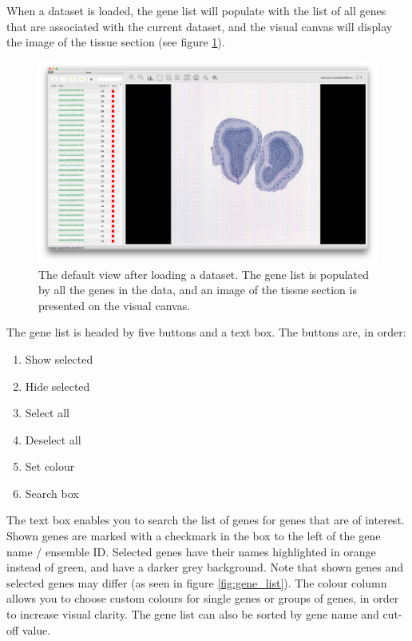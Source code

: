 \documentclass[10pt,a4paper,titlepage]{book}
\begin{document}
When a dataset is loaded, the gene list will populate with the list of all genes that are associated with the current dataset, and the visual canvas will display the image of the tissue section (see figure \ref{fig:default_loaded_data}). 
\begin{figure}[h]
	\centering
	\includegraphics[width=0.8\linewidth]{./Pictures/default_dataset_loaded}
	\caption[Default view after loading a dataset]{The default view after loading a dataset. The gene list is populated by all the genes in the data, and an image of the tissue section is presented on the visual canvas.}
	\label{fig:default_loaded_data}
\end{figure}

The gene list is headed by five buttons and a text box. The buttons are, in order:
\begin{enumerate}
\item	Show selected
\item	Hide selected
\item	Select all
\item	Deselect all
\item	Set colour
\item	Search box
\end{enumerate}

The text box enables you to search the list of genes for genes that are of interest. Shown genes are marked with a checkmark in the box to the left of the gene name / ensemble ID. Selected genes have their names highlighted in orange instead of green, and have a darker grey background. Note that shown genes and selected genes may differ (as seen in figure \ref{fig:gene_list}). The colour column allows you to choose custom colours for single genes or groups of genes, in order to increase visual clarity. The gene list can also be sorted by gene name and cut-off value.
\end{document}
